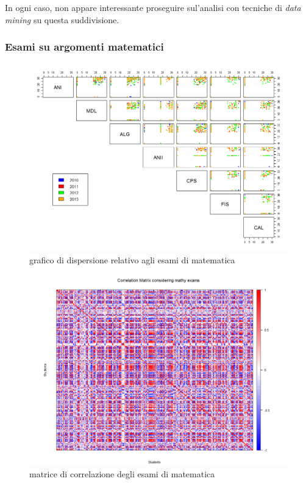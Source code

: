 In ogni caso, non appare interessante proseguire sul'analisi con tecniche di \textit{data mining} su questa suddivisione.

\subsubsection{Esami su argomenti matematici}

\begin{figure}
    \centering
    \caption{grafico di dispersione relativo agli esami di matematica}
    \label{esami_mat}
	\includegraphics[scale=0.32]{img/scatter_plot_8_gen.png}
\end{figure}

\begin{figure}
    \centering
    \caption{matrice di correlazione degli esami di matematica}
    \label{esami_mat_corr}
	\includegraphics[scale=0.32]{img/corr_matrix_3.png}
\end{figure}

